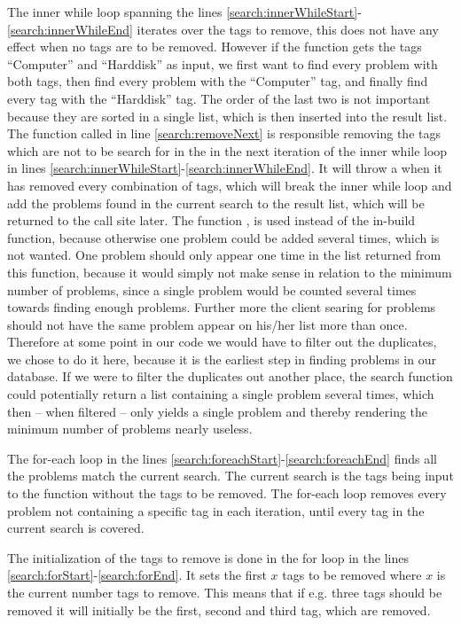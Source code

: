 The inner while loop spanning the lines \ref{search:innerWhileStart}-\ref{search:innerWhileEnd} iterates over the tags to remove, this does not have any effect when no tags are to be removed.
However if the function gets the tags ``Computer'' and ``Harddisk'' as input, we first want to find every problem with both tags, then find every problem with the ``Computer'' tag, and finally find every tag with the ``Harddisk'' tag.
The order of the last two is not important because they are sorted in a single list, which is then inserted into the result list.
The  function called in line \ref{search:removeNext} is responsible removing the tags which are not to be search for in the in the next iteration of the inner while loop in lines \ref{search:innerWhileStart}-\ref{search:innerWhileEnd}.
It will throw a  when it has removed every combination of tags, which will break the inner while loop and add the problems found in the current search to the result list, which will be returned to the call site later.
The function , is used instead of the in-build  function, because otherwise one problem could be added several times, which is not wanted.
One problem should only appear one time in the list returned from this function, because it would simply not make sense in relation to the minimum number of problems, since a single problem would be counted several times towards finding enough problems.
Further more the client searing for problems should not have the same problem appear on his/her list more than once.
Therefore at some point in our code we would have to filter out the duplicates, we chose to do it here, because it is the earliest step in finding problems in our database.
If we were to filter the duplicates out another place, the search function could potentially return a list containing a single problem several times, which then -- when filtered -- only yields a single problem and thereby rendering the minimum number of problems nearly useless.

The for-each loop in the lines \ref{search:foreachStart}-\ref{search:foreachEnd} finds all the problems match the current search.
The current search is the tags being input to the function without the tags to be removed.
The for-each loop removes every problem not containing a specific tag in each iteration, until every tag in the current search is covered.

The initialization of the tags to remove is done in the for loop in the lines \ref{search:forStart}-\ref{search:forEnd}.
It sets the first $x$ tags to be removed where $x$ is the current number tags to remove.
This means that if e.g. three tags should be removed it will initially be the first, second and third tag, which are removed.

